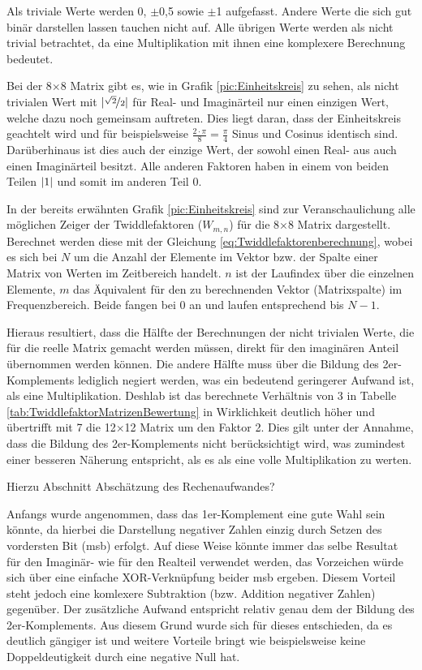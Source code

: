  Als triviale Werte werden 0, $\pm$0,5 sowie $\pm$1 aufgefasst.
 Andere Werte die sich gut binär darstellen lassen
 tauchen nicht auf. Alle übrigen Werte werden als nicht trivial betrachtet, da eine Multiplikation mit ihnen
 eine komplexere Berechnung bedeutet.
 
 Bei der 8$\times$8 Matrix gibt es, wie in Grafik \ref{pic:Einheitskreis} zu sehen, als nicht trivialen Wert mit $\lvert\nicefrac{\sqrt{2}}{2}\rvert$ für Real- und 
 Imaginärteil nur einen einzigen Wert, welche dazu noch gemeinsam auftreten. Dies liegt daran, dass
 der Einheitskreis geachtelt wird und für beispielsweise $\frac{2\cdot\pi}{8}=\frac{\pi}{4}$ Sinus und Cosinus identisch sind. Darüberhinaus ist dies auch 
 der einzige Wert, der sowohl einen Real- aus auch einen Imaginärteil besitzt. Alle anderen Faktoren haben in einem von beiden Teilen $\lvert1\rvert$ und somit im anderen Teil 0.
 
 In der bereits erwähnten Grafik \ref{pic:Einheitskreis} sind zur Veranschaulichung alle möglichen Zeiger der Twiddlefaktoren ($W_{m,n}$) für die 8$\times$8 Matrix dargestellt. 
 Berechnet werden diese mit der
 Gleichung \ref{eq:Twiddlefaktorenberechnung}, wobei es sich bei $N$ um die Anzahl der Elemente im Vektor bzw. der Spalte einer Matrix von Werten im Zeitbereich 
 handelt. $n$ ist der Laufindex über die einzelnen Elemente, $m$ das Äquivalent für den zu berechnenden Vektor (Matrixspalte) im Frequenzbereich. Beide 
 fangen bei 0 an und laufen entsprechend bis $N-1$.


 
 
 Hieraus resultiert, dass die Hälfte der Berechnungen der nicht trivialen Werte, die für die reelle Matrix gemacht werden müssen,
 direkt für den imaginären Anteil übernommen werden können. Die andere Hälfte muss über die Bildung des 2er-Komplements lediglich negiert werden, was ein 
 bedeutend geringerer Aufwand ist, als eine Multiplikation. 
 Deshlab ist das berechnete Verhältnis von 3 in Tabelle \ref{tab:TwiddlefaktorMatrizenBewertung} in Wirklichkeit deutlich höher und übertrifft mit 7 die 12$\times$12
 Matrix um den Faktor 2. Dies gilt unter der Annahme, dass die Bildung des 2er-Komplements nicht berücksichtigt wird, was zumindest einer besseren Näherung 
 entspricht, als es als eine volle Multiplikation zu werten.
 
 Hierzu Abschnitt Abschätzung des Rechenaufwandes?
 
 Anfangs wurde angenommen, dass das 1er-Komplement eine gute Wahl sein könnte, da hierbei die Darstellung negativer Zahlen einzig durch Setzen des vordersten 
 Bit (\gls{msb}) erfolgt. Auf diese Weise könnte immer das selbe Resultat für den Imaginär- wie für den Realteil verwendet werden, das Vorzeichen würde sich über eine 
 einfache XOR-Verknüpfung beider \gls{msb} ergeben.
 Diesem Vorteil steht jedoch eine komlexere Subtraktion (bzw. Addition negativer Zahlen) gegenüber. Der zusätzliche Aufwand entspricht 
 relativ genau dem der Bildung des 2er-Komplements. Aus diesem Grund wurde sich für dieses entschieden, da es deutlich gängiger ist und weitere Vorteile bringt wie 
 beispielsweise keine Doppeldeutigkeit durch eine negative Null hat.
 

